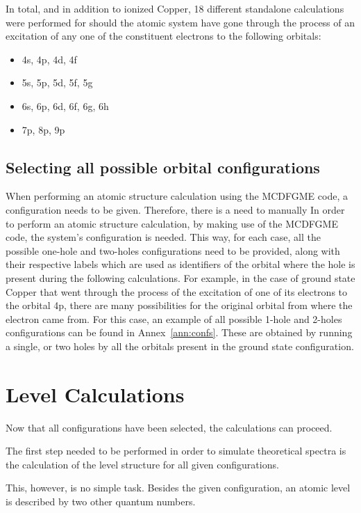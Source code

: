 In total, and in addition to ionized Copper, 18 different standalone calculations were performed for should the atomic system have gone through the process of an excitation of any one of the constituent electrons to the following orbitals:

\begin{itemize}
    \item 4s, 4p, 4d, 4f
    \item 5s, 5p, 5d, 5f, 5g
    \item 6s, 6p, 6d, 6f, 6g, 6h
    \item 7p, 8p, 9p
\end{itemize}


\subsection{Selecting all possible orbital configurations}
When performing an atomic structure calculation using the \gls{MCDFGME} code, a configuration needs to be given. Therefore, there is a need to manually
In order to perform an atomic structure calculation, by making use of the \gls{MCDFGME} code, the system's configuration is needed. This way, for each case, all the possible one-hole and two-holes configurations need to be provided, along with their respective labels which are used as identifiers of the orbital where the hole is present during the following calculations. For example, in the case of ground state Copper that went through the process of the excitation of one of its electrons to the orbital 4p, there are many possibilities for the original orbital from where the electron came from. For this case, an example of all possible 1-hole and 2-holes configurations can be found in Annex~\ref{ann:confs}. These are obtained by running a single, or two holes by all the orbitals present in the ground state configuration.


\section{Level Calculations}
Now that all configurations have been selected, the calculations can proceed.

The first step needed to be performed in order to simulate theoretical spectra is the calculation of the level structure for all given configurations.

This, however, is no simple task. Besides the given configuration, an atomic level is described by two other quantum numbers.

